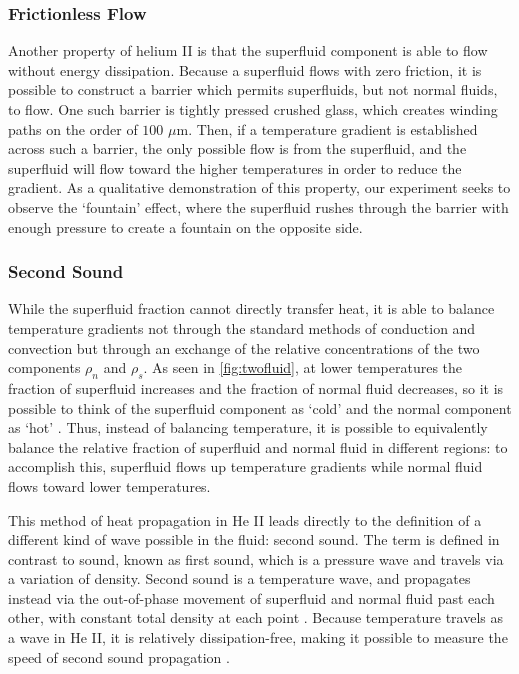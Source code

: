 \subsubsection{Frictionless Flow}\label{frictionlessflow}
Another property of helium II is that the superfluid component is able
to flow without energy dissipation. Because a superfluid flows with
zero friction, it is possible to construct a barrier which permits
superfluids, but not normal fluids, to flow. One such barrier is
tightly pressed crushed glass, which creates winding paths on the
order of $100$ $\mu$m. Then, if a temperature gradient is established
across such a barrier, the only possible flow is from the superfluid,
and the superfluid will flow toward the higher temperatures in order
to reduce the gradient. As a qualitative demonstration of this
property, our experiment seeks to observe the `fountain' effect, where
the superfluid rushes through the barrier with enough pressure to
create a fountain on the opposite side.

\subsubsection{Second Sound}\label{secondsound}
While the superfluid fraction cannot directly transfer heat, it
is able to balance temperature gradients not through the standard
methods of conduction and convection but through an exchange of the
relative concentrations of the two components $\rho_n$ and
$\rho_s$. As seen in \ref{fig:twofluid}, at lower temperatures the
fraction of superfluid increases and the fraction of normal fluid
decreases, so it is possible to think of the superfluid component as
`cold' and the normal component as `hot' \cite{atkins}. Thus, instead
of balancing temperature, it is possible to equivalently balance the
relative fraction of superfluid and normal fluid in different regions:
to accomplish this, superfluid flows up temperature gradients while
normal fluid flows toward lower temperatures.

This method of heat propagation in He II leads directly to the
definition of a different kind of wave possible in the fluid: second
sound. The term is defined in contrast to sound, known as first sound,
which is a pressure wave and travels via a variation of
density. Second sound is a temperature wave, and propagates instead
via the out-of-phase movement of superfluid and normal fluid past each
other, with constant total density at each point
\cite{atkins}. Because temperature travels as a wave in He II, it is
relatively dissipation-free, making it possible to measure the speed
of second sound propagation \cite{atkins}.

